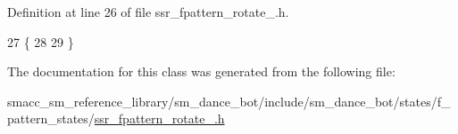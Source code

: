 Definition at line 26 of file ssr\+\_\+fpattern\+\_\+rotate\+\_.\+h.


\begin{DoxyCode}
27   \{
28     
29   \}
\end{DoxyCode}


The documentation for this class was generated from the following file\+:\begin{DoxyCompactItemize}
\item 
smacc\+\_\+sm\+\_\+reference\+\_\+library/sm\+\_\+dance\+\_\+bot/include/sm\+\_\+dance\+\_\+bot/states/f\+\_\+pattern\+\_\+states/\hyperlink{ssr__fpattern__rotate__1_8h}{ssr\+\_\+fpattern\+\_\+rotate\+\_.\+h}\end{DoxyCompactItemize}

